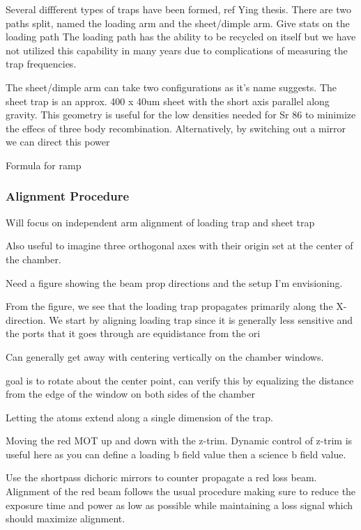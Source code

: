 Several diffferent types of traps have been formed, ref Ying thesis. There are two paths split, named the loading arm and the sheet/dimple arm. Give stats on the loading path The loading path has the ability to be recycled on itself but we have not utilized this capability in many years due to complications of measuring the trap frequencies. 

The sheet/dimple arm can take two configurations as it's name suggests. The sheet trap is an approx. 400 x 40um sheet with the short axis parallel along gravity. This geometry is useful for the low densities needed for Sr 86 to minimize the effecs of three body recombination. Alternatively, by switching out a mirror we can direct this power

Formula for ramp

\subsubsection{Alignment Procedure} \label{sssec:1064_align}

Will focus on independent arm alignment of loading trap and sheet trap

Also useful to imagine three orthogonal axes with their origin set at the center of the chamber.

Need a figure showing the beam prop directions and the setup I'm envisioning.


From the figure, we see that the loading trap propagates primarily along the X-direction. We start by aligning loading trap since it is generally less sensitive and the ports that it goes through are equidistance from the ori

Can generally get away with centering vertically on the chamber windows. 

goal is to rotate about the center point, can verify this by equalizing the distance from the edge of the window on both sides of the chamber

Letting the atoms extend along a single dimension of the trap. 

Moving the red MOT up and down with the z-trim. Dynamic control of z-trim is useful here as you can define a loading b field value then a science b field value.

Use the shortpass dichoric mirrors to counter propagate a red loss beam. Alignment of the red beam follows the usual procedure making sure to reduce the exposure time and power as low as possible while maintaining a loss signal which should maximize alignment.

